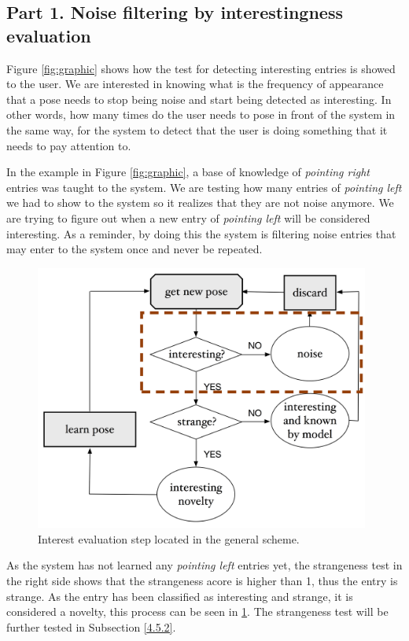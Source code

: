 \subsection{Part 1. Noise filtering by interestingness evaluation}

Figure \ref{fig:graphic} shows how the test for detecting interesting entries is showed to the user. We are interested in knowing what is the frequency of appearance that a pose needs to stop being noise and start being detected as interesting. In other words, how many times do the user needs to pose in front of the system in the same way, for the system to detect that the user is doing something that it needs to pay attention to.

In the example in Figure \ref{fig:graphic}, a base of knowledge of \emph{pointing right} entries was taught to the system. We are testing how many entries of \emph{pointing left} we had to show to the system so it realizes that they are not noise anymore. We are trying to figure out when a new entry of \emph{pointing left} will be considered interesting. As a reminder, by doing this the system is filtering noise entries that may enter to the system once and never be repeated. 

\begin{figure}[h]
\includegraphics[width=11cm]{Figures/Esquema_interest}
\centering
\caption{Interest evaluation step located in the general scheme. \label{fig:int}}
\end{figure}

As the system has not learned any \emph{pointing left} entries yet, the strangeness test in the right side shows that the strangeness acore is higher than 1, thus the entry is strange. As the entry has been classified as interesting and strange, it is considered a novelty, this process can be seen in \ref{fig:int}. The strangeness test will be further tested in Subsection \ref{4.5.2}.

